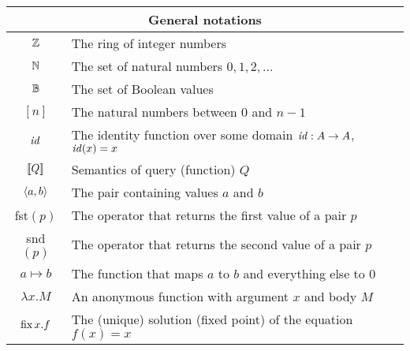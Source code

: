 \noindent
\begin{center}
\begin{tabular}{|c|p{10cm}|} \hline

\multicolumn{2}{|c|}{General notations} \\ \hline
$\mathbb{Z}$ & The ring of integer numbers \\
$\mathbb{N}$ & The set of natural numbers $0, 1, 2, \ldots$ \\
$\mathbb{B}$ & The set of Boolean values \\
$[n]$ & The natural numbers between 0 and $n-1$ \\
$\mathit{id}$ & The identity function over some domain $\mathit{id}: A \to A$, $\mathit{id}(x) = x$ \\
$\llbracket Q \rrbracket$ & Semantics of query (function) $Q$ \\
$\langle a,b \rangle$ & The pair containing values $a$ and $b$ \\
fst$(p)$ & The operator that returns the first value of a pair $p$ \\
snd$(p)$ & The operator that returns the second value of a pair $p$ \\
$a \mapsto b$ & The function that maps $a$ to $b$ and everything else to 0 \\          
$\lambda x.M$ & An anonymous function with argument $x$ and body $M$ \\
$\mbox{fix}\,x.f$ & The (unique) solution (fixed point) of the equation $f(x) = x$ \\
\hline
\end{tabular}


\end{center}
